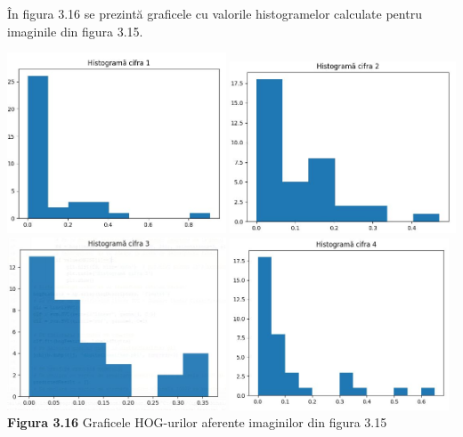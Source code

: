 \documentclass[a4paper,12pt]{report}
\newcommand\tab[1][1cm]{\hspace*{#1}}
\begin{document}
\tab În figura 3.16 se prezintă graficele cu valorile histogramelor calculate pentru imaginile din figura 3.15.
\begin {center} 
	\begin {footnotesize} 
		\includegraphics[width = 65mm]{fig3_16_1} 
		\includegraphics[width = 67mm]{fig3_16_2} 
		\includegraphics[width = 65mm]{fig3_16_3} 
		\includegraphics[width = 65mm]{fig3_16_4} \\
		\textbf  {Figura 3.16}  Graficele HOG-urilor aferente imaginilor din figura 3.15
	\end {footnotesize} 
\end {center}
\end{document}
